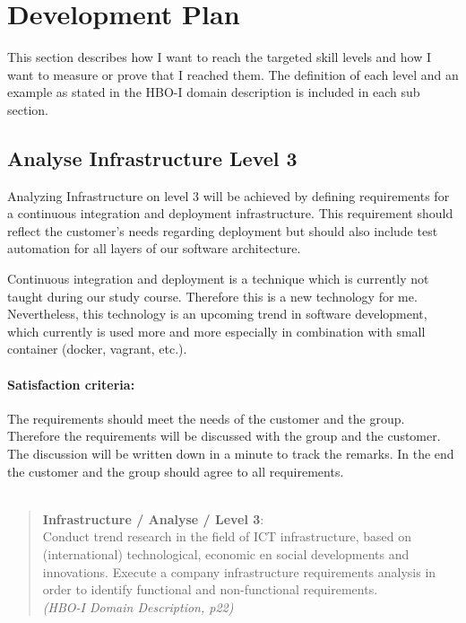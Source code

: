 
\section{Development Plan}
\label{sec:development}

This section describes how I want to reach the targeted skill levels and how I want to measure or prove that I reached them.
The definition of each level and an example as stated in the HBO-I domain description is included in each sub section.


\subsection{Analyse Infrastructure Level 3}
\label{ai3}

Analyzing Infrastructure on level 3 will be achieved by defining requirements for a continuous integration and deployment infrastructure. This requirement should reflect the customer's needs regarding deployment but should also include test automation for all layers of our software architecture. 

Continuous integration and deployment is a technique which is currently not taught during our study course. Therefore this is a new technology for me. 
Nevertheless, this technology is an upcoming trend in software development, which currently is used more and more especially in combination with small container (docker, vagrant, etc.).
\paragraph{Satisfaction criteria:} The requirements should meet the needs of the customer and the group. Therefore the requirements will be discussed with the group and the customer. The discussion will be written down in a minute to track the remarks. In the end the customer and the group should agree to all requirements.
~\\~\\
\begin{minipage}{\textwidth}
\begin{quote}
	\textbf{Infrastructure / Analyse / Level 3}: \\
	Conduct trend research in the field of ICT infrastructure, based on (international) technological, economic en social developments and innovations. 
	Execute a company infrastructure requirements analysis in order to identify functional and non-functional requirements.
	\\ \textit{(HBO-I Domain Description, p22)}
\end{quote}
\end{minipage}

